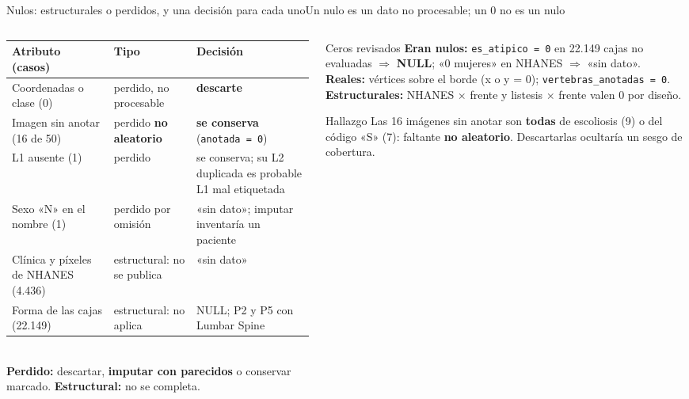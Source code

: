 \documentclass[aspectratio=169,10pt]{beamer}
\begin{document}
\begin{frame}{Nulos: estructurales o perdidos, y una decisión para cada uno}{Un nulo es un dato no procesable; un 0 no es un nulo}
  \begin{columns}[T]
    \begin{column}{0.58\textwidth}
      \scriptsize
      \renewcommand{\arraystretch}{1.12}
      \begin{tabularx}{\linewidth}{@{}Xp{1.75cm}p{2.55cm}@{}}
        \toprule
        Atributo (casos) & Tipo & Decisión \\ \midrule
        Coordenadas o clase (0) & perdido, no procesable & \textbf{descarte} \\
        Imagen sin anotar (16 de 50) & perdido \textbf{no aleatorio} & \textbf{se conserva} (\texttt{anotada = 0}) \\
        L1 ausente (1) & perdido & se conserva; su L2 duplicada es probable L1 mal etiquetada \\
        Sexo «N» en el nombre (1) & perdido por omisión & «sin dato»; imputar inventaría un paciente \\
        Clínica y píxeles de NHANES (4.436) & estructural: no se publica & «sin dato» \\
        Forma de las cajas (22.149) & estructural: no aplica & NULL; P2 y P5 con Lumbar Spine \\ \bottomrule
      \end{tabularx}\\[0.8ex]
      \footnotesize
      \textbf{Perdido:} descartar, \textbf{imputar con parecidos} o conservar marcado. \textbf{Estructural:} no se completa.
    \end{column}
    \begin{column}{0.39\textwidth}
      \begin{block}{Ceros revisados}
        \scriptsize
        \textbf{Eran nulos:} \texttt{es\_atipico = 0} en 22.149 cajas no evaluadas $\Rightarrow$ \textbf{NULL}; «0 mujeres» en NHANES $\Rightarrow$ «sin dato».\\[0.5ex]
        \textbf{Reales:} vértices sobre el borde (x o y = 0); \texttt{vertebras\_anotadas = 0}.\\[0.5ex]
        \textbf{Estructurales:} NHANES $\times$ frente y listesis $\times$ frente valen 0 por diseño.
      \end{block}
      \begin{block}{Hallazgo}
        \scriptsize Las 16 imágenes sin anotar son \textbf{todas} de escoliosis (9) o del código «S» (7): faltante \textbf{no aleatorio}. Descartarlas ocultaría un sesgo de cobertura.
      \end{block}
    \end{column}
  \end{columns}
\end{frame}
\end{document}
